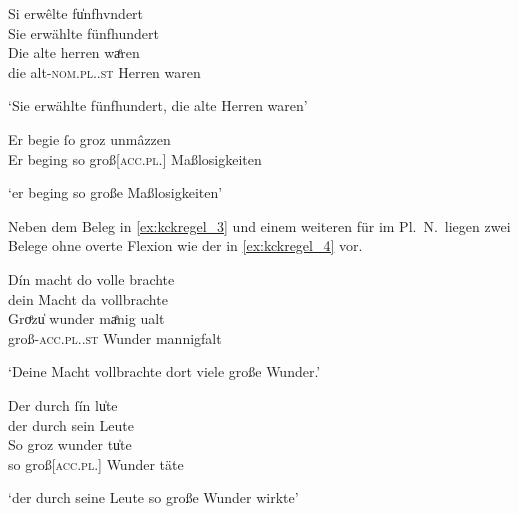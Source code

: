 \begin{exe}
\ex \label{ex:kckregel}
	\begin{xlist}
	\ex \label{ex:kckregel_1}
		\gll Si erwêlte fu̍nfhvndert \\
			Sie erwählte fünfhundert \\
	\sn \gll Die alte herren waͤren \\
			die alt-\textsc{nom.pl.\MascM.st} Herren waren \\
		\begin{taggedline}{\parencites[\pno~51\ra, 37]{kc:K}[vgl.][8477]{schroeder1895}}
		\trans `Sie erwählte fünfhundert, die alte Herren waren'
		\end{taggedline}

	\ex \label{ex:kckregel_2}
		\gll Er begie ſo groz unmâzzen \\
			Er beging so groß[\textsc{acc.pl.\FemI}] Maßlosigkeiten \\
		\begin{taggedline}{\parencites[\pno~8\rb, 25]{kc:K}[vgl.][1286]{schroeder1895}}
		\trans `er beging so große Maßlosigkeiten'
		\end{taggedline}
	\end{xlist}
\end{exe}

Neben dem Beleg in \cref{ex:kckregel_3} und einem weiteren für  im
Pl.~N.\ liegen zwei Belege ohne overte Flexion wie der in \cref{ex:kckregel_4}
vor.

\begin{exe}
\ex	\begin{xlist}
	\ex \label{ex:kckregel_3}
		\gll Dín macht do {volle brachte} \\
			dein Macht da vollbrachte \\
	\sn \gll Groͤzu̍ wunder {maͤnig ualt} \\
			groß-\textsc{acc.pl.\NeutI.st} Wunder mannigfalt \\
		\begin{taggedline}{\parencites%
			[\pno~1\ra, 20]{kc:K}[vgl.]
			[\pno~1\ra, 18--19]{kc:C1}%
			[\pno~1\ra, 21--22]{kc:Z}%
		}
		\trans `Deine Macht vollbrachte dort viele große Wunder.'
		\end{taggedline}

	\ex \label{ex:kckregel_4}
		\gll Der durch ſín lu̍te \\
			der durch sein Leute \\
	\sn \gll So groz wunder tu̍te \\
			so groß[\textsc{acc.pl.\NeutI}] Wunder täte \\
		\begin{taggedline}{\parencites%
			[\pno~62\rb, 21--22]{kc:K}[vgl.]%
			[\pno~54\va, 13--14]{kc:C1}%
			[\pno~206\va, 19--20]{kc:Z}%
			[10331--10332]{schroeder1895}
		}
		\trans `der durch seine Leute so große Wunder wirkte'
		\end{taggedline}
	\end{xlist}
\end{exe}

